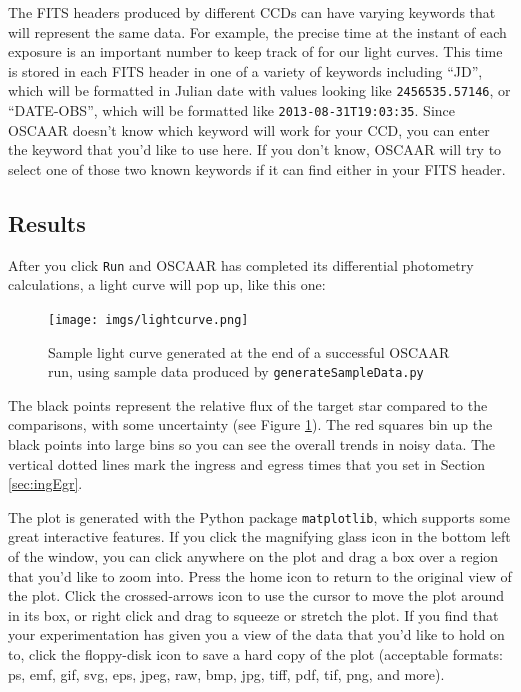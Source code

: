 \documentclass[a4paper]{article}
\newcommand{\code}[1]{\texttt{#1}}
\begin{document}
The FITS headers produced by different CCDs can have varying keywords that will represent the same data. For example, the precise time at the instant of each exposure is an important number to keep track of for our light curves. This time is stored in each FITS header in one of a variety of keywords including ``JD'', which will be formatted in Julian date with values looking like \code{2456535.57146}, or ``DATE-OBS'', which will be formatted like \code{2013-08-31T19:03:35}. Since OSCAAR doesn't know which keyword will work for your CCD, you can enter the keyword that you'd like to use here. If you don't know, OSCAAR will try to select one of those two known keywords if it can find either in your FITS header.

\subsection{Results}
After you click \code{Run} and OSCAAR has completed its differential photometry calculations, a light curve will pop up, like this one:
\begin{figure}[H]
\begin{center}
\texttt{[image: imgs/lightcurve.png]}
\caption{Sample light curve generated at the end of a successful OSCAAR run, using sample data produced by \code{generateSampleData.py}}
\label{fig:lightcurve}
\end{center}	
\end{figure}
The black points represent the relative flux of the target star compared to the comparisons, with some uncertainty (see Figure \ref{fig:lightcurve}). The red squares bin up the black points into large bins so you can see the overall trends in noisy data. The vertical dotted lines mark the ingress and egress times that you set in Section \ref{sec:ingEgr}. 

The plot is generated with the Python package \code{matplotlib}, which supports some great interactive features. If you click the magnifying glass icon in the bottom left of the window, you can click anywhere on the plot and drag a box over a region that you'd like to zoom into. Press the home icon to return to the original view of the plot. Click the crossed-arrows icon to use the cursor to move the plot around in its box, or right click and drag to squeeze or stretch the plot. If you find that your experimentation has given you a view of the data that you'd like to hold on to, click the floppy-disk icon to save a hard copy of the plot (acceptable formats: ps, emf, gif, svg, eps, jpeg, raw, bmp, jpg, tiff, pdf, tif, png, and more). 
\end{document}
